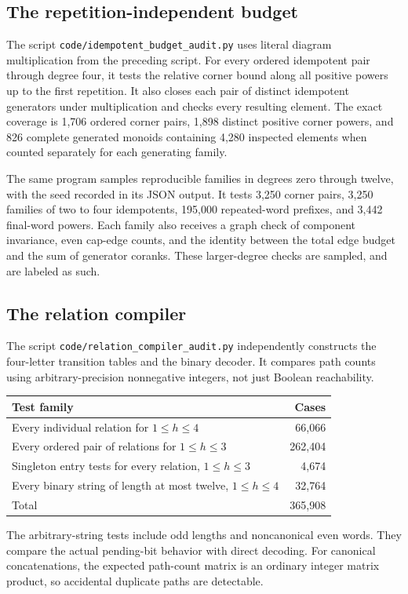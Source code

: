 \subsection{The repetition-independent budget}

The script \texttt{code/idempotent\_budget\_audit.py} uses literal
diagram multiplication from the preceding script. For every
ordered idempotent pair through degree four, it tests the relative
corner bound along all positive powers up to the first repetition.
It also closes each pair of distinct idempotent generators under
multiplication and checks every resulting element. The exact
coverage is 1,706 ordered corner pairs, 1,898 distinct positive
corner powers, and 826 complete generated monoids containing
4,280 inspected elements when counted separately for each
generating family.

The same program samples reproducible families in degrees zero
through twelve, with the seed recorded in its JSON output. It
tests 3,250 corner pairs, 3,250 families of two to four
idempotents, 195,000 repeated-word prefixes, and 3,442
final-word powers. Each family also receives a graph check of
component invariance, even cap-edge counts, and the identity
between the total edge budget and the sum of generator coranks.
These larger-degree checks are sampled, and are labeled as such.

\subsection{The relation compiler}

The script \texttt{code/relation\_compiler\_audit.py} independently
constructs the four-letter transition tables and the binary decoder.
It compares path counts using arbitrary-precision nonnegative
integers, not just Boolean reachability.

\begin{center}
\begin{tabular}{p{}r}
\toprule
Test family & Cases\\
\midrule
Every individual relation for $1\le h\le4$ & 66,066\\
Every ordered pair of relations for $1\le h\le3$ & 262,404\\
Singleton entry tests for every relation, $1\le h\le3$ & 4,674\\
Every binary string of length at most twelve, $1\le h\le4$ & 32,764\\
\midrule
Total & 365,908\\
\bottomrule
\end{tabular}
\end{center}
The arbitrary-string tests include odd lengths and noncanonical
even words. They compare the actual pending-bit behavior with
direct decoding. For canonical concatenations, the expected
path-count matrix is an ordinary integer matrix product,
so accidental duplicate paths are detectable.

